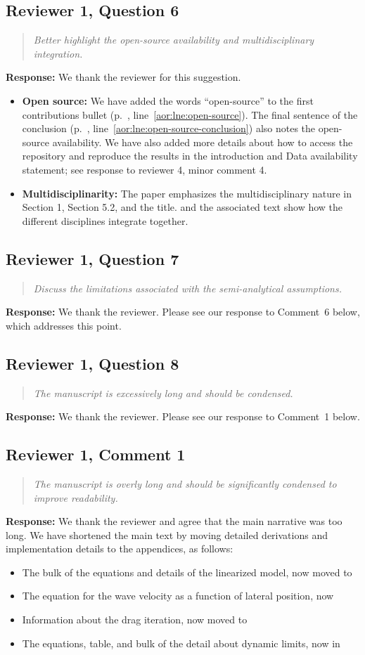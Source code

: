 \documentclass[11pt]{article}
\newcommand{\rcomment}[2]{\subsection*{#1}\begin{quote}\itshape #2\end{quote}}
\newcommand{\response}{\noindent\textbf{Response:} }
\begin{document}
\rcomment{Reviewer 1, Question 6}{Better highlight the open-source availability and multidisciplinary integration.}
\response We thank the reviewer for this suggestion.
\begin{itemize}
  \item \textbf{Open source:}
  We have added the words ``open-source'' to the first contributions bullet (p.~\pageref{aor:lne:open-source}, line~\ref{aor:lne:open-source}).
  The final sentence of the conclusion (p.~\pageref{aor:lne:open-source-conclusion}, line~\ref{aor:lne:open-source-conclusion}) also notes the open-source availability.
  We have also added more details about how to access the repository and reproduce the results in the introduction and Data availability statement; see response to reviewer 4, minor comment 4.
  \item \textbf{Multidisciplinarity:} 
  The paper emphasizes the multidisciplinary nature in Section 1, Section 5.2, and the title.
   and the associated text show how the different disciplines integrate together.
\end{itemize}


\rcomment{Reviewer 1, Question 7}{Discuss the limitations associated with the semi-analytical assumptions.}
\response We thank the reviewer. Please see our response to Comment~6 below, which addresses this point.

\rcomment{Reviewer 1, Question 8}{The manuscript is excessively long and should be condensed.}
\response We thank the reviewer. Please see our response to Comment~1 below.

\rcomment{Reviewer 1, Comment 1}{The manuscript is overly long and should be significantly condensed to improve readability.}
\response We thank the reviewer and agree that the main narrative was too long.
We have shortened the main text by moving detailed derivations and implementation details to the appendices, as follows:
\begin{itemize}
  \item The bulk of the equations and details of the linearized model, now moved to 
  \item The equation for the wave velocity as a function of lateral position, now  
  \item Information about the drag iteration, now moved to 
  \item The equations, table, and bulk of the detail about dynamic limits, now in 
\end{itemize}
\end{document}
